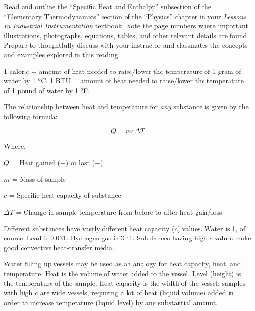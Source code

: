 

Read and outline the ``Specific Heat and Enthalpy'' subsection of the ``Elementary Thermodynamics'' section of the ``Physics'' chapter in your {\it Lessons In Industrial Instrumentation} textbook.  Note the page numbers where important illustrations, photographs, equations, tables, and other relevant details are found.  Prepare to thoughtfully discuss with your instructor and classmates the concepts and examples explored in this reading.














1 calorie = amount of heat needed to raise/lower the temperature of 1 gram of water by 1 $^{o}$C.  1 BTU = amount of heat needed to raise/lower the temperature of 1 pound of water by 1 $^{o}$F.

\vskip 10pt

The relationship between heat and temperature for {\it any} substance is given by the following formula:

$$Q = mc \Delta T$$

\noindent
Where,

$Q$ = Heat gained (+) or lost ($-$)

$m$ = Mass of sample
  
$c$ = Specific heat capacity of substance
 
$\Delta T$ = Change in sample temperature from before to after heat gain/loss

\vskip 10pt

Different substances have vastly different heat capacity ($c$) values.  Water is 1, of course.  Lead is 0.031.  Hydrogen gas is 3.41.  Substances having high $c$ values make good convective heat-transfer media.

\vskip 10pt

Water filling up vessels may be used as an analogy for heat capacity, heat, and temperature.  Heat is the volume of water added to the vessel.  Level (height) is the temperature of the sample.  Heat capacity is the width of the vessel: samples with high $c$ are wide vessels, requiring a lot of heat (liquid volume) added in order to increase temperature (liquid level) by any substantial amount.


